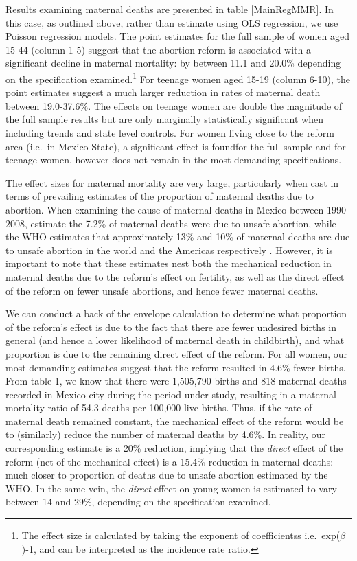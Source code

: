 \documentclass[a4paper, 11pt]{article}
\begin{document}
\begin{spacing}{2}
Results examining maternal deaths are presented in table \ref{MainRegMMR}. In this case, as outlined above, rather than estimate using OLS regression, we use Poisson regression models. The point estimates for the full sample of women aged 15-44 (column 1-5) suggest that the abortion reform is associated with a significant decline in maternal mortality: by between 11.1 and 20.0\% depending on the specification examined.\footnote{The effect size is calculated by taking the exponent of coefficientss i.e.\ exp($\beta$)-1, and can be interpreted as the incidence rate ratio.} For teenage women aged 15-19 (column 6-10), the point estimates suggest a much larger reduction in rates of maternal death between 19.0-37.6\%. The effects on teenage women are double the magnitude of the full sample results but are only marginally statistically significant when including trends and state level controls. For women living close to the reform area (i.e.\ in Mexico State), a significant effect is foundfor the full sample and for teenage women, however does not remain in the most demanding specifications.

The effect sizes for maternal mortality are very large, particularly when cast in terms of prevailing estimates of the proportion of maternal deaths due to abortion.  When examining the cause of maternal deaths in Mexico between 1990-2008, \citet{Schiavonetal2012} estimate the 7.2\% of maternal deaths were due to unsafe abortion, while the WHO estimates that approximately 13\% and 10\% of maternal deaths are due to unsafe abortion in the world and the Americas respectively \citep{WHO2011}.  However, it is important to note that these estimates nest both the mechanical reduction in maternal deaths due to the reform's effect on fertility, as well as the direct effect of the reform on fewer unsafe abortions, and hence fewer maternal deaths.

We can conduct a back of the envelope calculation to determine what proportion of the reform's effect is due to the fact that there are fewer undesired births in general (and hence a lower likelihood of maternal death in childbirth), and what proportion is due to the remaining direct effect of the reform.  For all women, our most demanding estimates suggest that the reform resulted in 4.6\% fewer births.  From table 1, we know that there were 1,505,790 births and 818 maternal deaths recorded in Mexico city during the period under study, resulting in a maternal mortality ratio of 54.3 deaths per 100,000 live births.  Thus, if the rate of maternal death remained constant, the mechanical effect of the reform would be to (similarly) reduce the number of maternal deaths by 4.6\%.  In reality, our corresponding estimate is a 20\% reduction, implying that the \emph{direct} effect of the reform (net of the mechanical effect) is a 15.4\% reduction in maternal deaths: much closer to proportion of deaths due to unsafe abortion estimated by the WHO.  In the same vein, the \emph{direct} effect on young women is estimated to vary between 14 and 29\%, depending on the specification examined.


\end{spacing}
\end{document}
